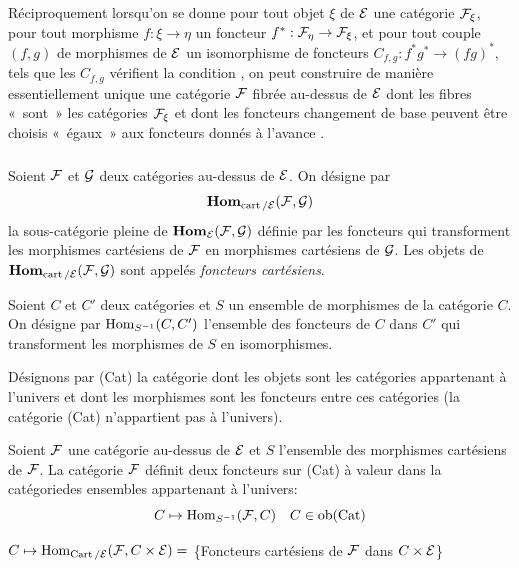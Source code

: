\documentclass[10pt]{../fichiers-configuration-latex/smfart}
\begin{document}
\subsubsection{}

Réciproquement lorsqu'on se donne pour tout objet $\xi$ de
${\mathcal E}$ une catégorie ${\mathcal F}_{\xi}$, pour tout morphisme
$f : \xi \to \eta$ un foncteur $f^{\ast} : \Ff_\eta \to
\Ff_{\xi}$, et pour tout couple $(f, g)$ de morphismes de
${\mathcal E}$ un isomorphisme de foncteurs $C_{f, g} : f^{\ast}
g^{\ast} \to (fg)^{\ast}$, tels que les $C_{f, g}$ vérifient la
condition , on peut construire de manière essentiellement
unique une catégorie ${\mathcal F}$ fibrée au-dessus de ${\mathcal E}$
dont les fibres « sont » les catégories ${\mathcal F}_{\xi}$ et dont
les foncteurs changement de base peuvent être choisis « égaux » aux
foncteurs donnés à l'avance \cite{SGA4-06:5}.

\subsubsection{}
Soient ${\mathcal F}$ et ${\mathcal G}$ deux catégories au-dessus de
${\mathcal E}$. On désigne par
$$
\operatorname{\mathbf{Hom}}_{\operatorname{cart}/{\mathcal E}} ({\mathcal F}, {\mathcal G})
$$
la sous-catégorie pleine de $\operatorname{\mathbf{Hom}}_{{\mathcal E}} ({\mathcal F},
{\mathcal G})$ définie par les foncteurs qui transforment les
morphismes cartésiens de ${\mathcal F}$ en morphismes cartésiens de
${\mathcal G}$. Les objets de \\ $\operatorname{\mathbf{Hom}}_{\operatorname{cart}/{\mathcal E}} ({\mathcal F},
{\mathcal G})$ sont appelés \emph{foncteurs cartésiens}.

Soient $C$ et $C'$ deux catégories et $S$ un ensemble de morphismes de
la catégorie $C$. On désigne par $\operatorname{Hom}_{S^{-1}} (C, C')$ l'ensemble des
foncteurs de $C$ dans $C'$ qui transforment les morphismes de $S$ en
isomorphismes.

Désignons par (Cat) la catégorie dont les objets sont les catégories
appartenant à l'univers et dont les morphismes sont les foncteurs
entre ces catégories (la catégorie (Cat) n'appartient pas à l'univers).

Soient ${\mathcal F}$  une catégorie au-dessus de ${\mathcal E}$ et $S$
l'ensemble des morphismes cartésiens de ${\mathcal F}$. La catégorie
${\mathcal F}$ définit deux foncteurs sur (Cat) à valeur dans la
catégorie\pageoriginale des ensembles appartenant à l'univers:
$$
C \mapsto \operatorname{Hom}_{S^{-1}} ({\mathcal F}, C)\quad C \in \operatorname{ob} (\operatorname{Cat})
$$

$C \mapsto \operatorname{Hom}_{\operatorname{Cart} /{\mathcal E}} ({\mathcal F}, C  \times
{\mathcal E}) =$ \{Foncteurs cartésiens de ${\mathcal F}$ dans $C \times
  {\mathcal E}$\}
\end{document}
